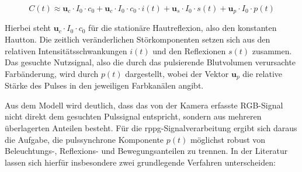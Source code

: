\begin{equation}
    C(t) \approx \mathbf{u}_c \cdot I_0 \cdot c_0 + \mathbf{u}_c \cdot I_0 \cdot c_0 \cdot i(t) + \mathbf{u}_s \cdot I_0 \cdot s(t) + \mathbf{u}_p \cdot I_0 \cdot p(t)
\label{eq:Mittelwertbildung}
\end{equation}

Hierbei steht $\mathbf{u}_c \cdot I_0 \cdot c_0$ für die stationäre Hautreflexion, also den konstanten Hautton. Die zeitlich veränderlichen Störkomponenten setzen sich aus den relativen Intensitätsschwankungen $i(t)$ und den Reflexionen $s(t)$ zusammen. Das gesuchte Nutzsignal, also die durch das pulsierende Blutvolumen verursachte Farbänderung, wird durch $p(t)$ dargestellt, wobei der Vektor $\mathbf{u}_p$ die relative Stärke des Pulses in den jeweiligen Farbkanälen angibt.

Aus dem Modell wird deutlich, dass das von der Kamera erfasste RGB-Signal nicht direkt dem gesuchten Pulssignal entspricht, sondern aus mehreren überlagerten Anteilen besteht. Für die \ac{rppg}-Signalverarbeitung ergibt sich daraus die Aufgabe, die pulssynchrone Komponente $p(t)$ möglichst robust von Beleuchtungs-, Reflexions- und Bewegungsanteilen zu trennen. In der Literatur lassen sich hierfür insbesondere zwei grundlegende Verfahren unterscheiden:

